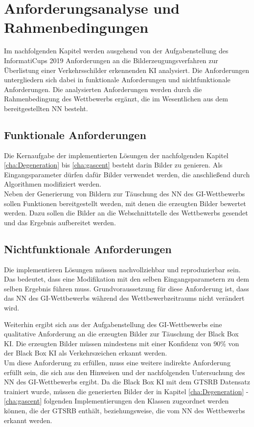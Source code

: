 \chapter{Anforderungsanalyse und Rahmenbedingungen}
\label{cha:AnfAnalyse}

Im nachfolgenden Kapitel werden ausgehend von der Aufgabenstellung des InformatiCups 2019 Anforderungen an die Bilderzeugungsverfahren zur Überlistung einer Verkehrsschilder erkennenden \ac{KI} analysiert. Die Anforderungen untergliedern sich dabei in funktionale Anforderungen und nichtfunktionale Anforderungen. Die analysierten Anforderungen werden durch die Rahmenbedingung des Wettbewerbs ergänzt, die im Wesentlichen aus dem bereitgestellten \acl{NN} besteht.

\section{Funktionale Anforderungen}
Die Kernaufgabe der implementierten Lösungen der nachfolgenden Kapitel \ref{cha:Degeneration} bis \ref{cha:gascent} besteht darin Bilder zu genieren. Als Eingangsparameter dürfen dafür Bilder verwendet werden, die anschließend durch Algorithmen modifiziert werden.\\
Neben der Generierung von Bildern zur Täuschung des \ac{NN} des \ac{GI}-Wettbewerbs sollen Funktionen bereitgestellt werden, mit denen die erzeugten Bilder bewertet werden. Dazu sollen die Bilder an die Webschnittstelle des Wettbewerbs gesendet und das Ergebnis aufbereitet werden.

\section{Nichtfunktionale Anforderungen}
Die implementieren Lösungen müssen nachvollziehbar und reproduzierbar sein. Das bedeutet, dass eine Modifikation mit den selben Eingangsparametern zu dem selben Ergebnis führen muss. Grundvoraussetzung für diese Anforderung ist, dass das \ac{NN} des \ac{GI}-Wettbewerbs während des Wettbewerbzeitraums nicht verändert wird.

Weiterhin ergibt sich aus der Aufgabenstellung des \ac{GI}-Wettbewerbs eine qualitative Anforderung an die erzeugten Bilder zur Täuschung der Black Box \ac{KI}. Die erzeugten Bilder müssen mindestens mit einer Konfidenz von 90\% von der Black Box \ac{KI} als Verkehrszeichen erkannt werden. \cite{gesellschaft_fur_informatik_e.v._informaticup2019-irrbilder.pdf_2018} \\
Um diese Anforderung zu erfüllen, muss eine weitere indirekte Anforderung erfüllt sein, die sich aus den Hinweisen und der nachfolgenden Untersuchung des \ac{NN} des \ac{GI}-Wettbewerbs ergibt. Da die Black Box \ac{KI} mit dem \ac{GTSRB} Datensatz trainiert wurde, müssen die generierten Bilder der in Kapitel \ref{cha:Degeneration} - \ref{cha:gascent} folgenden Implementierungen den Klassen zugeordnet werden können, die der \ac{GTSRB} enthält, beziehungsweise, die vom \ac{NN} des Wettbewerbs erkannt werden. 

